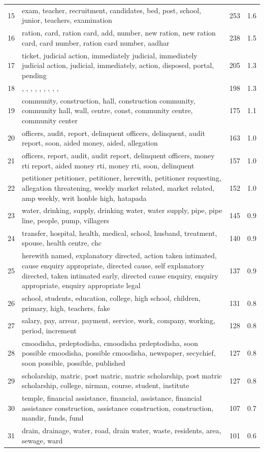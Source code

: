 \begin{table}[htbp]
\begin{tabular}{rlp{7cm}r}
15 & exam, teacher, recruitment, candidates, bed, post, school, junior, teachers, examination & 253 & 1.6 \\
16 & ration, card, ration card, add, number, new ration, new ration card, card number, ration card number, aadhar & 238 & 1.5 \\
17 & ticket, judicial action, immediately judicial, immediately judicial action, judicial, immediately, action, disposed, portal, pending & 205 & 1.3 \\
18 & , , , , , , , , ,  & 198 & 1.3 \\
19 & community, construction, hall, construction community, community hall, wall, centre, const, community centre, community center & 175 & 1.1 \\
20 & officers, audit, report, delinquent officers, delinquent, audit report, soon, aided money, aided, allegation & 163 & 1.0 \\
21 & officers, report, audit, audit report, delinquent officers, money rti report, aided money rti, money rti, soon, delinquent & 157 & 1.0 \\
22 & petitioner petitioner, petitioner, herewith, petitioner requesting, allegation threatening, weekly market related, market related, amp weekly, writ honble high, hatapada & 152 & 1.0 \\
23 & water, drinking, supply, drinking water, water supply, pipe, pipe line, people, pump, villagers & 145 & 0.9 \\
24 & transfer, hospital, health, medical, school, husband, treatment, spouse, health centre, chc & 140 & 0.9 \\
25 & herewith named, explanatory directed, action taken intimated, cause enquiry appropriate, directed cause, self explanatory directed, taken intimated early, directed cause enquiry, enquiry appropriate, enquiry appropriate legal & 137 & 0.9 \\
26 & school, students, education, college, high school, children, primary, high, teachers, fake & 131 & 0.8 \\
27 & salary, pay, arrear, payment, service, work, company, working, period, increment & 128 & 0.8 \\
28 & cmoodisha, prdeptodisha, cmoodisha prdeptodisha, soon possible cmoodisha, possible cmoodisha, newspaper, secychief, soon possible, possible, published & 127 & 0.8 \\
29 & scholarship, matric, post matric, matric scholarship, post matric scholarship, college, nirman, course, student, institute & 127 & 0.8 \\
30 & temple, financial assistance, financial, assistance, financial assistance construction, assistance construction, construction, mandir, funds, fund & 107 & 0.7 \\
31 & drain, drainage, water, road, drain water, waste, residents, area, sewage, ward & 101 & 0.6 \\
\bottomrule
\end{tabular}
\end{table}